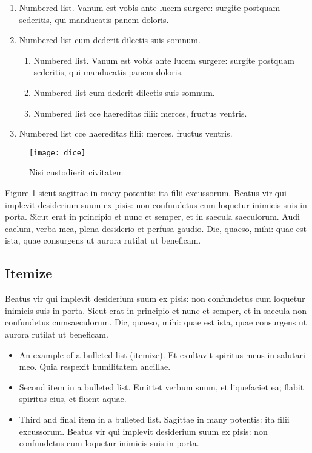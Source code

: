 \documentclass[numbers,compress]{vmsta}
\theoremstyle{definition}
\begin{document}
\begin{enumerate}
\item Numbered list. Vanum est vobis ante lucem surgere: surgite
postquam sederitis, qui manducatis panem doloris.

\item Numbered list cum dederit dilectis suis somnum.

\begin{enumerate}
\item Numbered list. Vanum est vobis ante lucem surgere: surgite
postquam sederitis, qui manducatis panem doloris.

\item Numbered list cum dederit dilectis suis somnum.

\item Numbered list cce haereditas filii: merces, fructus ventris.
\end{enumerate}

\item Numbered list cce haereditas filii: merces, fructus ventris.
\end{enumerate}


\begin{figure}[t]
\texttt{[image: dice]}%
\caption{Nisi custodierit civitatem}\label{f2} %
\end{figure}

Figure \ref{f2} sicut sagittae in many potentis: ita filii excussorum. Beatus vir qui
implevit desiderium suum ex pisis: non confundetus cum loquetur inimicis
suis in porta.  Sicut erat in principio et nunc et semper, et in saecula
saeculorum. Audi caelum, verba mea, plena desiderio et perfusa gaudio.
Dic, quaeso, mihi: quae est ista, quae consurgens ut aurora rutilat ut
beneficam.


\subsection{Itemize}

Beatus vir qui implevit desiderium
suum ex pisis: non confundetus cum loquetur inimicis suis in porta.
Sicut erat in principio et nunc et semper, et in saecula non
confundetus cumsaeculorum. Dic, quaeso, mihi: quae est ista, quae
consurgens ut aurora rutilat ut beneficam.

\begin{itemize}
\item An example of a bulleted list (itemize). Et exultavit spiritus meus in salutari meo.
Quia respexit humilitatem ancillae.

\item Second item in a bulleted list. Emittet verbum suum, et liquefaciet
ea; flabit spiritus eius, et fluent aquae.

\item Third and final item in a bulleted list. Sagittae in many potentis:
ita filii excussorum.  Beatus vir qui implevit desiderium suum ex
pisis: non confundetus cum loquetur inimicis suis in porta.
\end{itemize}
\end{document}
